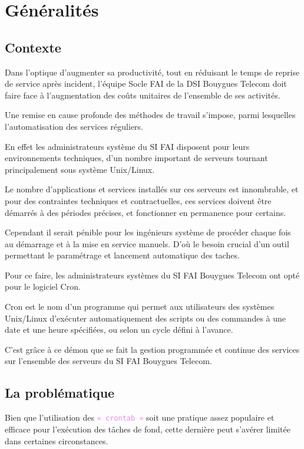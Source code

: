 \documentclass{bouygues-fr}
\begin{document}
\chapter{Généralités}

\section{Contexte}

Dans l'optique d'augmenter sa productivité, tout en réduisant le temps de reprise de service après incident, l'équipe Socle FAI de la DSI Bouygues Telecom doit faire face à l'augmentation des coûts unitaires de l'ensemble de ses activités.

Une remise en cause profonde des méthodes de travail s'impose, parmi lesquelles l'automatisation des services réguliers.

En effet les administrateurs système du SI FAI disposent pour leurs environnements techniques, d'un nombre important de serveurs tournant principalement sous système Unix/Linux.

Le nombre d'applications et services installés sur ces serveurs est innombrable, et pour des contraintes techniques et contractuelles, ces services doivent être démarrés à des périodes précises, et fonctionner en permanence pour certains.

Cependant il serait pénible pour les ingénieurs système de procéder chaque fois au démarrage et à la mise en service manuels. D'où le besoin crucial d'un outil permettant le paramétrage et lancement automatique des taches.

Pour ce faire, les administrateurs systèmes du SI FAI Bouygues Telecom ont opté pour le logiciel Cron.

Cron est le nom d'un programme qui permet aux utilisateurs des systèmes Unix/Linux d'exécuter automatiquement des scripts ou des commandes à une date et une heure spécifiées, ou selon un cycle défini à l'avance.

C'est grâce à ce démon que se fait la gestion programmée et continue des services sur l'ensemble des serveurs du SI FAI Bouygues Telecom.

\vspace{20pt}

\section{La problématique}
Bien que l'utilisation des \textcolor{violet}{\texttt{« crontab »}} soit une pratique assez populaire et efficace pour l'exécution des tâches de fond, cette dernière peut s'avérer limitée dans certaines circonstances.
\end{document}
